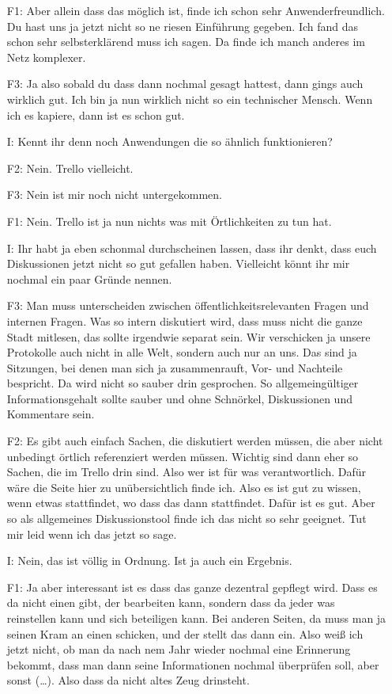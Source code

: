\begin{itemize}
    \item[F1:] Aber allein dass das m{\"o}glich ist, finde ich schon sehr Anwenderfreundlich. Du hast uns ja jetzt nicht so ne riesen Einf{\"u}hrung gegeben. Ich fand das schon sehr selbsterkl{\"a}rend muss ich sagen. Da finde ich manch anderes im Netz komplexer.
    \item[F3:] Ja also sobald du dass dann nochmal gesagt hattest, dann gings auch wirklich gut. Ich bin ja nun wirklich nicht so ein technischer Mensch. Wenn ich es kapiere, dann ist es schon gut.
    \item[I:] Kennt ihr denn noch Anwendungen die so {\"a}hnlich funktionieren?
    \item[F2:] Nein. Trello vielleicht.
    \item[F3:] Nein ist mir noch nicht untergekommen.
    \item[F1:] Nein. Trello ist ja nun nichts was mit {\"O}rtlichkeiten zu tun hat.
    \item[I:] Ihr habt ja eben schonmal durchscheinen lassen, dass ihr denkt, dass euch Diskussionen jetzt nicht so gut gefallen haben. Vielleicht k{\"o}nnt ihr mir nochmal ein paar Gr{\"u}nde nennen.
    \item[F3:] Man muss unterscheiden zwischen {\"o}ffentlichkeitsrelevanten Fragen und internen Fragen. Was so intern diskutiert wird, dass muss nicht die ganze Stadt mitlesen, das sollte irgendwie separat sein. Wir verschicken ja unsere Protokolle auch nicht in alle Welt, sondern auch nur an uns. Das sind ja Sitzungen, bei denen man sich ja zusammenrauft, Vor- und Nachteile bespricht. Da wird nicht so sauber drin gesprochen. So allgemeing{\"u}ltiger Informationsgehalt sollte sauber und ohne Schn{\"o}rkel, Diskussionen und Kommentare sein.
    \item[F2:] Es gibt auch einfach Sachen, die diskutiert werden m{\"u}ssen, die aber nicht unbedingt {\"o}rtlich referenziert werden m{\"u}ssen. Wichtig sind dann eher so Sachen, die im Trello drin sind. Also wer ist f{\"u}r was verantwortlich. Daf{\"u}r w{\"a}re die Seite hier zu un{\"u}bersichtlich finde ich. Also es ist gut zu wissen, wenn etwas stattfindet, wo dass das dann stattfindet. Daf{\"u}r ist es gut. Aber so als allgemeines Diskussionstool finde ich das nicht so sehr geeignet. Tut mir leid wenn ich das jetzt so sage.
    \item[I:] Nein, das ist v{\"o}llig in Ordnung. Ist ja auch ein Ergebnis.
    \item[F1:] Ja aber interessant ist es dass das ganze dezentral gepflegt wird. Dass es da nicht einen gibt, der bearbeiten kann, sondern dass da jeder was reinstellen kann und sich beteiligen kann. Bei anderen Seiten, da muss man ja seinen Kram an einen schicken, und der stellt das dann ein. Also wei{\ss} ich jetzt nicht, ob man da nach nem Jahr wieder nochmal eine Erinnerung bekommt, dass man dann seine Informationen nochmal {\"u}berpr{\"u}fen soll, aber sonst (\dots). Also dass da nicht altes Zeug drinsteht.

\end{itemize}
